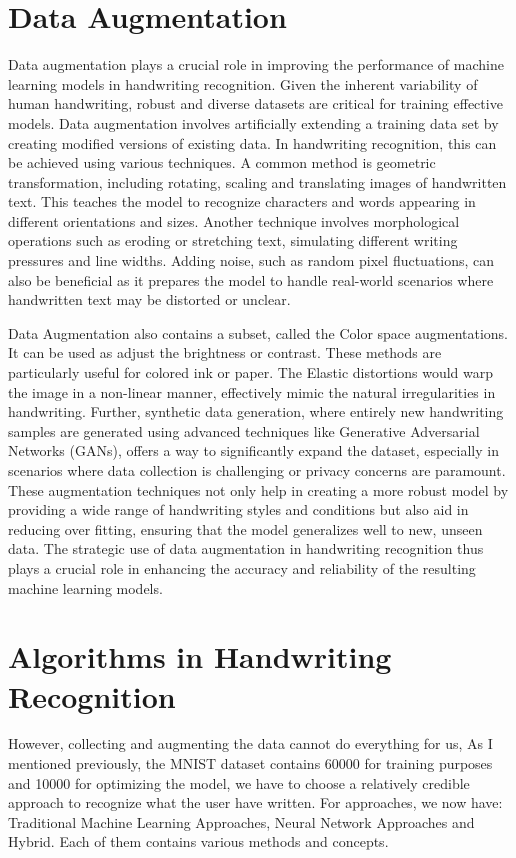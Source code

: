 \documentclass[12pt]{article}
\begin{document}
\section* {Data Augmentation}
Data augmentation plays a crucial role in improving the performance of machine learning models in handwriting recognition. Given the inherent variability of human handwriting, robust and diverse datasets are critical for training effective models. Data augmentation involves artificially extending a training data set by creating modified versions of existing data. In handwriting recognition, this can be achieved using various techniques. A common method is geometric transformation, including rotating, scaling and translating images of handwritten text. This teaches the model to recognize characters and words appearing in different orientations and sizes. Another technique involves morphological operations such as eroding or stretching text, simulating different writing pressures and line widths. Adding noise, such as random pixel fluctuations, can also be beneficial as it prepares the model to handle real-world scenarios where handwritten text may be distorted or unclear.

Data Augmentation also contains a subset, called the Color space augmentations. It can be used as adjust the brightness or contrast. These methods are particularly useful for colored ink or paper. The Elastic distortions would warp the image in a non-linear manner, effectively mimic the natural irregularities in handwriting. Further, synthetic data generation, where entirely new handwriting samples are generated using advanced techniques like Generative Adversarial Networks (GANs), offers a way to significantly expand the dataset, especially in scenarios where data collection is challenging or privacy concerns are paramount. These augmentation techniques not only help in creating a more robust model by providing a wide range of handwriting styles and conditions but also aid in reducing over fitting, ensuring that the model generalizes well to new, unseen data. The strategic use of data augmentation in handwriting recognition thus plays a crucial role in enhancing the accuracy and reliability of the resulting machine learning models.

\section* {Algorithms in Handwriting Recognition}
However, collecting and augmenting the data cannot do everything for us, As I mentioned previously, the MNIST dataset contains 60000 for training purposes and 10000 for optimizing the model, we have to choose a relatively credible approach to recognize what the user have written. For approaches, we now have: Traditional Machine Learning Approaches, Neural Network Approaches and Hybrid. Each of them contains various methods and concepts.
\end{document}
